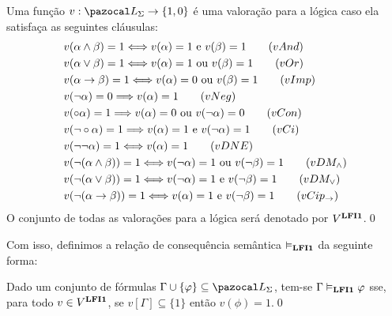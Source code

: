         \begin{definicao} \label{def:valoracoes}
            Uma função $v : \ling{} \to \{1, 0\}$ é uma valoração para a lógica \lfium{} caso ela satisfaça as seguintes cláusulas:
            \begin{align*}
                & v(\alpha \land \beta) = 1 \Longleftrightarrow v(\alpha) = 1 \text{ e } v(\beta) = 1\tag{\textbf{$vAnd$}}\\
                & v(\alpha \lor \beta) = 1 \Longleftrightarrow v(\alpha) = 1 \text{ ou } v(\beta) = 1\tag{\textbf{$vOr$}}\\
                & v(\alpha \to \beta) = 1 \Longleftrightarrow v(\alpha) = 0 \text{ ou } v(\beta) = 1\tag{\textbf{$vImp$}}\\
                & v(\neg \alpha) = 0 \Longrightarrow v(\alpha) = 1\tag{\textbf{$vNeg$}}\\
                & v(\circ \alpha) = 1 \Longrightarrow v(\alpha) = 0 \text{ ou } v(\neg \alpha) = 0\tag{\textbf{$vCon$}}\\
                & v(\neg \circ \alpha) = 1 \Longrightarrow v(\alpha) = 1 \text{ e } v(\neg \alpha) = 1\tag{\textbf{$vCi$}}\\
                & v(\neg \neg \alpha) = 1 \Longleftrightarrow v(\alpha) = 1\tag{\textbf{$vDNE$}}\\
                & v(\neg (\alpha \land \beta)) = 1 \Longleftrightarrow v(\neg \alpha) = 1 \text{ ou } v(\neg \beta) = 1\tag{\textbf{$vDM_{\land}$}}\\
                & v(\neg (\alpha \lor \beta)) = 1 \Longleftrightarrow v(\neg \alpha) = 1 \text{ e } v(\neg \beta) = 1\tag{\textbf{$vDM_{\lor}$}}\\
                & v(\neg (\alpha \to \beta)) = 1 \Longleftrightarrow v(\alpha) = 1 \text{ e } v(\neg \beta) = 1\tag{\textbf{$vCip_{\to}$}}
            \end{align*}
            O conjunto de todas as valorações para a lógica \lfium{} será denotado por $V^{{\normalfont\textbf{LFI1}}{}}$.\qed{}
        \end{definicao}

        Com isso, definimos a relação de consequência semântica $\vDash_{{\normalfont\textbf{LFI1}}{}}$ da seguinte forma:

        \begin{definicao}\label{def:conval}
            Dado um conjunto de fórmulas $\Gamma \cup \{\phi\} \subseteq \ling{}$, tem-se $\Gamma \vDash_{{\normalfont\textbf{LFI1}}{}} \varphi$ sse, para todo $v \in V^{{\normalfont\textbf{LFI1}}{}}$, se $v[\Gamma] \subseteq \{1\}$ então $v(\phi) = 1$.\qed{}
        \end{definicao}


